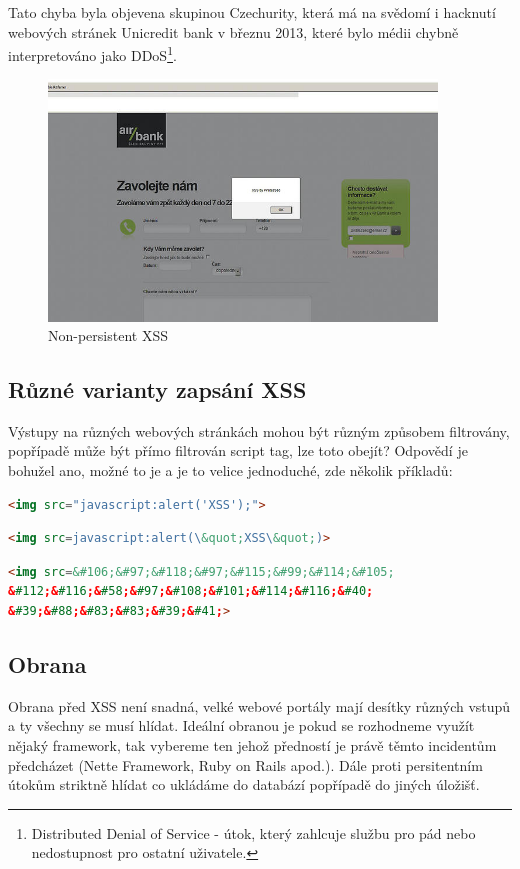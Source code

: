 \documentclass[12pt, a4paper]{report}
\begin{document}
Tato chyba byla objevena skupinou Czechurity, která má na svědomí i hacknutí webových stránek Unicredit bank v březnu 2013, které bylo médii chybně interpretováno jako DDoS\footnote{Distributed Denial of Service - útok, který zahlcuje službu pro pád nebo nedostupnost pro ostatní uživatele.}.
\begin{figure}[h!]
\includegraphics[width=390px]{./examples/xss-airbank.png}
\caption{Non-persistent XSS}
\label{obr.airbank}
\end{figure}

\subsection{Různé varianty zapsání XSS}
Výstupy na různých webových stránkách mohou být různým způsobem filtrovány, popřípadě může být přímo filtrován script tag, lze toto obejít? Odpovědí je bohužel ano, možné to je a je to velice jednoduché, zde několik příkladů:

\begin{lstlisting}[label=some-code, language=HTML, caption=Schování JavaScriptu do neexistujícího obrázku]
<img src="javascript:alert('XSS');">
\end{lstlisting}

\begin{lstlisting}[label=some-code, language=HTML, caption=Zakázané uvozovky? Nahrazení entitami \ldots]
<img src=javascript:alert(\&quot;XSS\&quot;)>
\end{lstlisting}

\begin{lstlisting}[label=some-code, language=HTML, caption=Další možností je převedení na unikód]
<img src=&#106;&#97;&#118;&#97;&#115;&#99;&#114;&#105;
&#112;&#116;&#58;&#97;&#108;&#101;&#114;&#116;&#40;
&#39;&#88;&#83;&#83;&#39;&#41;>
\end{lstlisting}

\subsection{Obrana}
Obrana před XSS není snadná, velké webové portály mají desítky různých vstupů a ty všechny se musí hlídat. Ideální obranou je pokud se rozhodneme využít nějaký framework, tak vybereme ten jehož předností je právě těmto incidentům předcházet (Nette Framework, Ruby on Rails apod.). Dále proti persitentním útokům striktně hlídat co ukládáme do databází popřípadě do jiných úložišť.
\end{document}
